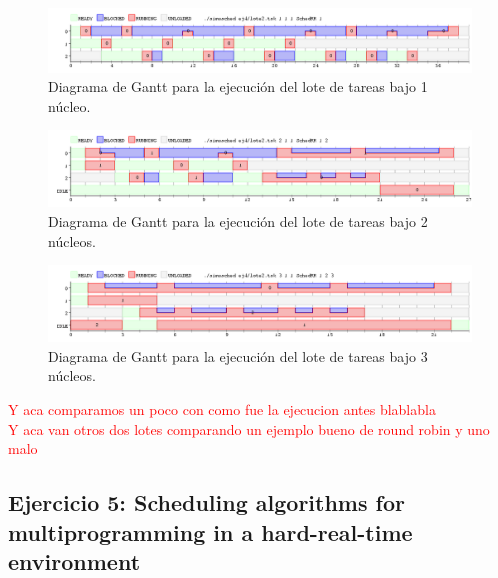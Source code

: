 \documentclass[a4paper]{article}
\begin{document}
 \begin{figure}[h!]
   \begin{center}
 	\includegraphics[scale=0.5]{imagenes/ej4/1core.png}
 	\caption{Diagrama de Gantt para la ejecuci\'on del lote de tareas bajo 1 n\'ucleo.}
   \end{center}
 \end{figure} 
 

 \begin{figure}[h!]
   \begin{center}
 	\includegraphics[scale=0.5]{imagenes/ej4/2core.png}
 	\caption{Diagrama de Gantt para la ejecuci\'on del lote de tareas bajo 2 n\'ucleos.}
   \end{center}
 \end{figure} 
 


  \begin{figure}[h!]
   \begin{center}
 	\includegraphics[scale=0.5]{imagenes/ej4/3core.png}
 	\caption{Diagrama de Gantt para la ejecuci\'on del lote de tareas bajo 3 n\'ucleos.}
   \end{center}
 \end{figure} 
 
 \textcolor{red}{Y aca comparamos un poco con como fue la ejecucion antes blablabla}\\
 
 \textcolor{red}{Y aca van otros dos lotes comparando un ejemplo bueno de round robin y uno malo}

\bigskip

 \subsection{Ejercicio 5: Scheduling algorithms for multiprogramming in a hard-real-time environment}
 
\end{document}
